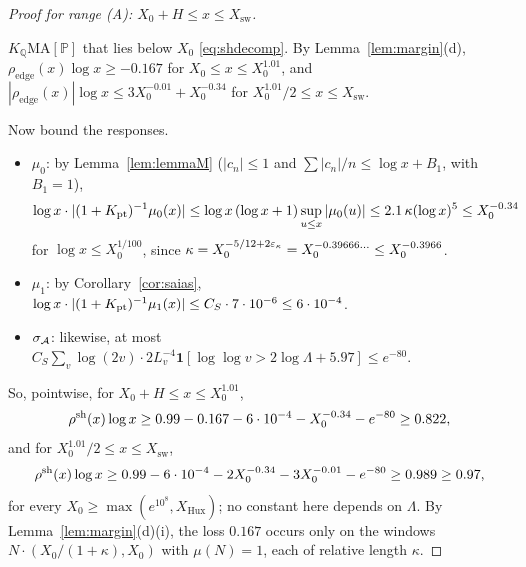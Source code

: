 \begin{proof}[Proof for range \textup{(A)}: $X_0+H\le x\le X_{\mathrm{sw}}$]
\begin{enumerate}[label=(\alph*)]
  $K_{\mathbb Q}\mathrm{MA}[\mathbb P]$ that lies below $X_0$ \eqref{eq:shdecomp}. By Lemma~\ref{lem:margin}(d),
  $\rho_{\mathrm{edge}}(x)\log x\ge-0.167$ for $X_0\le x\le X_0^{1.01}$, and
  $|\rho_{\mathrm{edge}}(x)|\log x\le3X_0^{-0.01}+X_0^{-0.34}$ for $X_0^{1.01}/2\le x\le X_{\mathrm{sw}}$.
\end{enumerate}
\endgroup
Now bound the responses.
\begin{itemize}
\item $\mu_0$: by Lemma~\ref{lem:lemmaM} ($|c_n|\le1$ and $\sum|c_n|/n\le\log x+B_1$, with $B_1=1$),
  \[
    \log x\cdot|(1+K_{\mathrm{pt}})^{-1}\mu_0(x)|\le\log x\,(\log x+1)\sup_{u\le x}|\mu_0(u)|\le2.1\,\kappa(\log x)^5\le X_0^{-0.34}
  \]
  for $\log x\le X_0^{1/100}$, since $\kappa=X_0^{-5/12+2\varepsilon_\kappa}=X_0^{-0.39666\ldots}\le X_0^{-0.3966}$.
\item $\mu_1$: by Corollary~\ref{cor:saias}, $\log x\cdot|(1+K_{\mathrm{pt}})^{-1}\mu_1(x)|\le C_S\cdot7\cdot10^{-6}\le6\cdot10^{-4}$.
\item $\sigma_{\mathcal{A}}$: likewise, at most $C_S\sum_v\log(2v)\cdot2L_v^{-4}\mathbf 1[\log\log v>2\log\Lambda+5.97]\le e^{-80}$.
\end{itemize}
So, pointwise, for $X_0+H\le x\le X_0^{1.01}$,
\[
  \rho^{\mathrm{sh}}(x)\log x\ge0.99-0.167-6\cdot10^{-4}-X_0^{-0.34}-e^{-80}\ge0.822,
\]
and for $X_0^{1.01}/2\le x\le X_{\mathrm{sw}}$,
\[
  \rho^{\mathrm{sh}}(x)\log x\ge0.99-6\cdot10^{-4}-2X_0^{-0.34}-3X_0^{-0.01}-e^{-80}\ge0.989\ge0.97,
\]
for every $X_0\ge\max(e^{10^8},X_{\mathrm{Hux}})$; no constant here depends on $\Lambda$. By Lemma~\ref{lem:margin}(d)(i), the loss
$0.167$ occurs only on the windows $N\cdot(X_0/(1+\kappa),X_0)$ with $\mu(N)=1$, each of relative length $\kappa$.
\end{proof}

